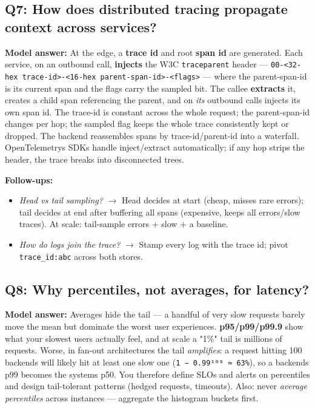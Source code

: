\documentclass[11pt]{article}
\providecommand{\tightlist}{\setlength{\itemsep}{1pt}\setlength{\parskip}{0pt}}
\begin{document}
\subsection{Q7: How does distributed tracing propagate context across services?}\label{q7-how-does-distributed-tracing-propagate-context-across-services}

\textbf{Model answer:} At the edge, a \textbf{trace id} and root \textbf{span id} are generated. Each service, on an outbound call, \textbf{injects} the W3C \texttt{traceparent} header --- \texttt{00-\textless{}32-hex\ trace-id\textgreater{}-\textless{}16-hex\ parent-span-id\textgreater{}-\textless{}flags\textgreater{}} --- where the parent-span-id is its current span and the flags carry the sampled bit. The callee \textbf{extracts} it, creates a child span referencing the parent, and on \emph{its} outbound calls injects its own span id. The trace-id is constant across the whole request; the parent-span-id changes per hop; the sampled flag keeps the whole trace consistently kept or dropped. The backend reassembles spans by trace-id/parent-id into a waterfall. OpenTelemetry\textquotesingle s SDKs handle inject/extract automatically; if any hop strips the header, the trace breaks into disconnected trees.

\textbf{Follow-ups:}

\begin{itemize}
\tightlist
\item
  \emph{Head vs tail sampling?} \(\rightarrow\) Head decides at start (cheap, misses rare errors); tail decides at end after buffering all spans (expensive, keeps all errors/slow traces). At scale: tail-sample errors + slow + a baseline.
\item
  \emph{How do logs join the trace?} \(\rightarrow\) Stamp every log with the trace id; pivot \texttt{trace\_id:abc} across both stores.
\end{itemize}

\subsection{Q8: Why percentiles, not averages, for latency?}\label{q8-why-percentiles-not-averages-for-latency}

\textbf{Model answer:} Averages hide the tail --- a handful of very slow requests barely move the mean but dominate the worst user experiences. \textbf{p95/p99/p99.9} show what your slowest users actually feel, and at scale a "1\%" tail is millions of requests. Worse, in fan-out architectures the tail \emph{amplifies}: a request hitting 100 backends will likely hit at least one slow one (\texttt{1\ −\ 0.99¹⁰⁰\ ≈\ 63\%}), so a backend\textquotesingle s p99 becomes the system\textquotesingle s p50. You therefore define SLOs and alerts on percentiles and design tail-tolerant patterns (hedged requests, timeouts). Also: never \emph{average percentiles} across instances --- aggregate the histogram buckets first.
\end{document}
